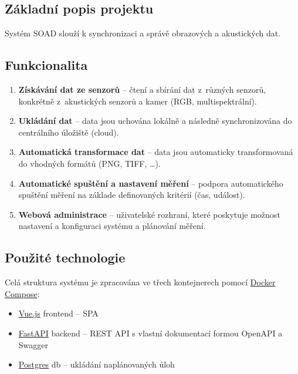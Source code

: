 \documentclass[12pt]{article}
\begin{document}
    \begin{teamwork}
        \section{Základní popis projektu}\label{sec:zakld-popis}
        Systém SOAD slouží k synchronizaci a správě obrazových a akustických dat.

        \subsection{Funkcionalita}\label{subsec:funkcionalita}

        \begin{enumerate}
            \item \textbf{Získávání dat ze senzorů} -- čtení a sbírání dat z~různých senzorů, konkrétně z~akustických senzorů a kamer (RGB, multispektrální).
            \item \textbf{Ukládání dat} -- data jsou uchována lokálně a následně synchronizována do centrálního úložiště (cloud).
            \item \textbf{Automatická transformace dat} -- data jsou automaticky transformovaná do vhodných formátů (PNG, TIFF, \ldots).
            \item \textbf{Automatické spuštění a nastavení měření} -- podpora automatického spuštění měření na základe definovaných kritérií (čas, událost).
            \item \textbf{Webová administrace} -- uživatelské rozhraní, které poskytuje možnost nastavení a konfiguraci systému a plánování měření.
        \end{enumerate}

        \subsection{Použité technologie}\label{subsec:techstack}

        Celá struktura systému je zpracována ve třech kontejnerech pomocí \href{https://docs.docker.com/compose/}{Docker Compose}:

        \begin{itemize}
            \item \href{https://vuejs.org/}{Vue.js} frontend – SPA
            \item \href{https://fastapi.tiangolo.com/}{FastAPI} backend – REST API s vlastní dokumentací formou OpenAPI a Swagger
            \item \href{https://www.postgresql.org/}{Postgres} db – ukládání naplánovaných úloh
        \end{itemize}


\end{teamwork}
\end{document}
